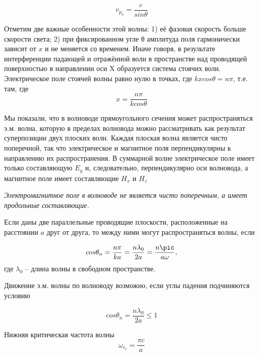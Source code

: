\documentclass[a4paper]{article}
\begin{document}
 \begin{equation}
     v_p_h = \frac{c}{sin \theta}
 \end{equation}
 
 Отметим две важные особенности этой волны: 1) её фазовая скорость
больше скорости света; 2) при фиксированном угле θ амплитуда поля
гармонически зависит от $x$ и не меняется со временем. Иначе говоря, в
результате интерференции падающей и отражённой волн в пространстве
над проводящей поверхностью в направлении оси X образуется система стоячих волн. Электрическое поле стоячей волны равно нулю в точках, где $kx cos\theta = n\pi$, т.е. там, где
\begin{equation}
    x = \frac{n \pi}{k cos \theta}
\end{equation}

Мы показали, что в волноводе прямоугольного сечения может распространяться э.м. волна, которую в пределах волновода можно рассматривать как результат суперпозиции двух плоских волн. Каждая плоская волна является чисто поперечной, так что электрическое
и магнитное поля перпендикулярны к направлению их распространения.
В суммарной волне электрическое поле имеет только составляющую $E_y$
и, следовательно, перпендикулярно оси волновода, а магнитное поле имеет составляющие $H_x$ и $H_z$ \par

\textit{Электромагнитное поле в волноводе не является чисто поперечным, а имеет продольные составляющие.}

Если даны две параллельные проводящие плоскости, расположенные на расстоянии $a$ друг от друга, то между ними могут распространяться волны, если

\begin{equation}
    cos \theta_n = \frac{n\pi}{ka} = \frac{n\lambda_0}{2a} = \frac{n\pic}{a\omega},
\end{equation}
где $\lambda_0$ -- длина волны в свободном пространстве. \par

Движение э.м. волны по волноводу возможно, если углы падения подчиняются условию

\begin{equation}
     cos \theta_n = \frac {n\lambda_0}{2a} \le 1
\end{equation}

Нижняя критическая частота волны
\begin{equation}
    \omega_c_r = \frac{\pi c}{a}
\end{equation}
\end{document}
